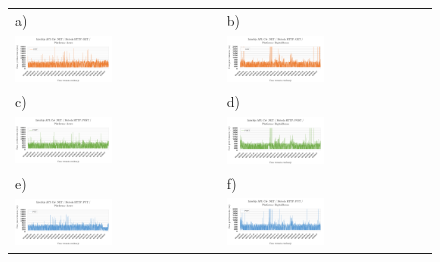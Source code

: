 \begin{figure}[htb]
  \centering
	\begin{tabular}{@{}ll@{}}
    a) & b) \\
    \includegraphics[width=0.49\textwidth]{rys05/dotnet-get-azure.pdf} & \includegraphics[width=0.49\textwidth]{rys05/dotnet-get-digitalocean.pdf} \\
    c) & d) \\
    \includegraphics[width=0.49\textwidth]{rys05/dotnet-post-azure.pdf} & \includegraphics[width=0.49\textwidth]{rys05/dotnet-post-digitalocean.pdf} \\
    e) & f) \\
    \includegraphics[width=0.49\textwidth]{rys05/dotnet-put-azure.pdf} & \includegraphics[width=0.49\textwidth]{rys05/dotnet-put-digitalocean.pdf} \\

\end{tabular}
\end{figure}
